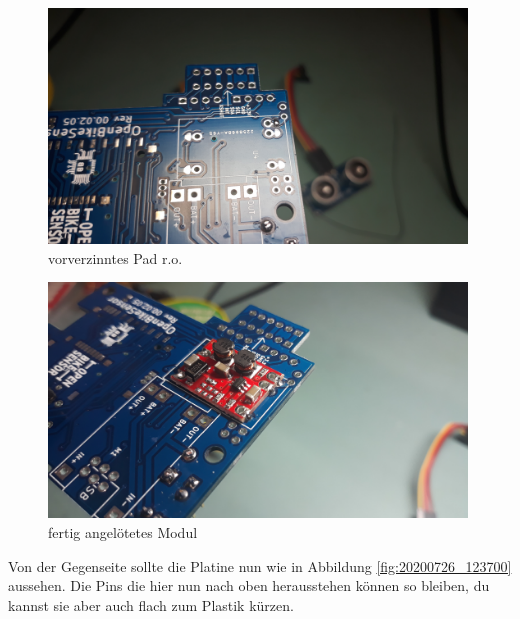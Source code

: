 \documentclass[12pt, a4paper]{article}		%
\begin{document}
\begin{minipage}[t]{0.49\textwidth}
\begin{figure}[H]
	\centering
		\includegraphics[width=0.99\textwidth]{Grafiken/20200902_191734.jpg}
	\caption{vorverzinntes Pad r.o.}
	\label{fig:20200726_121444}
\end{figure}
\end{minipage}
\begin{minipage}[t]{0.49\textwidth}
\begin{figure}[H]
	\centering
		\includegraphics[width=0.99\textwidth]{Grafiken/20200902_191918.jpg}
	\caption{fertig angelötetes Modul}
	\label{fig:20200726_121444}
\end{figure}
\end{minipage}

Von der Gegenseite sollte die Platine nun wie in Abbildung \ref{fig:20200726_123700} aussehen. Die Pins die hier nun nach oben herausstehen können so bleiben, du kannst sie aber auch flach zum Plastik kürzen.
\end{document}
